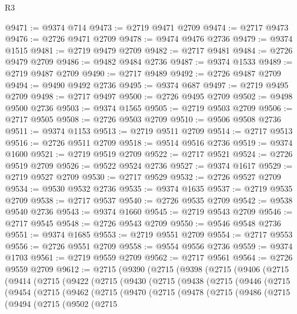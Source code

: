 \begin{lexlean}{R3}
\begin{coremodule}
@9471 := @9374 @714
@9473 := @2719 @9471 @2709
@9474 := @2717 @9473
@9476 := @2726 @9471 @2709
@9478 := @9474 @9476 @2736
@9479 := @9374 @1515
@9481 := @2719 @9479 @2709
@9482 := @2717 @9481
@9484 := @2726 @9479 @2709
@9486 := @9482 @9484 @2736
@9487 := @9374 @1533
@9489 := @2719 @9487 @2709
@9490 := @2717 @9489
@9492 := @2726 @9487 @2709
@9494 := @9490 @9492 @2736
@9495 := @9374 @687
@9497 := @2719 @9495 @2709
@9498 := @2717 @9497
@9500 := @2726 @9495 @2709
@9502 := @9498 @9500 @2736
@9503 := @9374 @1565
@9505 := @2719 @9503 @2709
@9506 := @2717 @9505
@9508 := @2726 @9503 @2709
@9510 := @9506 @9508 @2736
@9511 := @9374 @1153
@9513 := @2719 @9511 @2709
@9514 := @2717 @9513
@9516 := @2726 @9511 @2709
@9518 := @9514 @9516 @2736
@9519 := @9374 @1600
@9521 := @2719 @9519 @2709
@9522 := @2717 @9521
@9524 := @2726 @9519 @2709
@9526 := @9522 @9524 @2736
@9527 := @9374 @1617
@9529 := @2719 @9527 @2709
@9530 := @2717 @9529
@9532 := @2726 @9527 @2709
@9534 := @9530 @9532 @2736
@9535 := @9374 @1635
@9537 := @2719 @9535 @2709
@9538 := @2717 @9537
@9540 := @2726 @9535 @2709
@9542 := @9538 @9540 @2736
@9543 := @9374 @1660
@9545 := @2719 @9543 @2709
@9546 := @2717 @9545
@9548 := @2726 @9543 @2709
@9550 := @9546 @9548 @2736
@9551 := @9374 @1685
@9553 := @2719 @9551 @2709
@9554 := @2717 @9553
@9556 := @2726 @9551 @2709
@9558 := @9554 @9556 @2736
@9559 := @9374 @1703
@9561 := @2719 @9559 @2709
@9562 := @2717 @9561
@9564 := @2726 @9559 @2709
@9612 := @2715
    (@9390
      (@2715
        (@9398
          (@2715
            (@9406
              (@2715
                (@9414
                  (@2715
                    (@9422
                      (@2715
                        (@9430
                          (@2715
                            (@9438
                              (@2715
                                (@9446
                                  (@2715
                                    (@9454
                                      (@2715
                                        (@9462
                                          (@2715
                                            (@9470
                                              (@2715
                                                (@9478
                                                  (@2715
                                                    (@9486
                                                      (@2715
                                                        (@9494
                                                          (@2715
                                                            (@9502
                                                              (@2715

\end{coremodule}
\end{lexlean}
